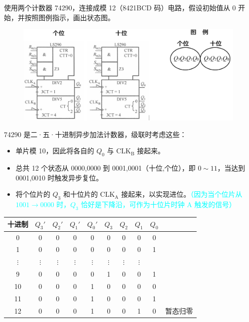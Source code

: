 \documentclass[UTF8]{ctexart}
\begin{document}
{\color{cyan!50!black} 使用两个计数器 74290，连接成模 12（8421BCD 码）电路，假设初始值从 0 开始，并按照图例指示，画出状态图。

\begin{figure}[htb]
  \centering
  \includegraphics[width=12cm]{题目.png}
\end{figure}
}

74290 是二·五·十进制异步加法计数器，级联时考虑这些：
\begin{itemize}
    \item 单片模 10，因此将各自的 $Q_0$ 与 $\mathrm{CLK_B}$ 接起来。
    \item 总共 12 个状态从 0000,0000 到 0001,0001（十位,个位），即 $0\sim 11$，当达到 0001,0010 时触发异步复位。
    \item 将个位片的 $Q_3$ 和十位片的 $\mathrm{CLK_A}$ 接起来，以实现进位。\textcolor{cyan}{（因为当个位片从 $1001\to 0000$ 时，$Q_3$ 恰好是下降沿，可作为十位片时钟 A 触发的信号）}
\end{itemize}

\vspace{-1cm}
\begin{table}[htb]
  \centering
  \begin{tabular}{cccccccccc}
  \toprule
  十进制 & $Q_3'$ & $Q_2'$ & $Q_1'$ & $Q_0'$ & $Q_3$ & $Q_2$ & $Q_1$ & $Q_0$ \\
  \midrule
  0& 0&0&0&0&0&0&0&0 \\
  1& 0&0&0&0&0&0&0&1 \\
  $\vdots$ & $\vdots$ & $\vdots$ & $\vdots$ & $\vdots$ & $\vdots$ & $\vdots$ & $\vdots$  \\
  9& 0&0&0&0&1&0&0&1 \\
  10& 0&0&0&1&0&0&0&0 \\
  11& 0&0&0&1&0&0&0&1 \\
  12& 0&0&0&1&0&0&1&0 & 暂态归零 \\
  \bottomrule
  \end{tabular}
\end{table}
\end{document}
